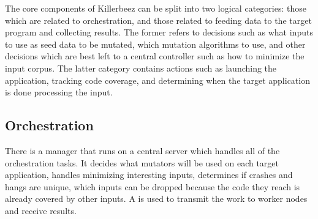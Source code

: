 The core components of Killerbeez can be split into two logical categories:
those which are related to orchestration, and those related to feeding data
to the target program and collecting results.  The former refers to decisions
such as what inputs to use as seed data to be mutated, which mutation
algorithms to use, and other decisions which are best left to a central
controller such as how to minimize the input corpus.  The latter category
contains actions such as launching the application, tracking code coverage,
and determining when the target application is done processing the input.

\subsection{Orchestration}
There is a manager that runs on a central server which handles all of the
orchestration tasks.  It decides what mutators will be used on each target
application, handles minimizing interesting inputs, determines if crashes
and hangs are unique, which inputs can be dropped because the code they
reach is already covered by other inputs. A \BOINC{} is used to transmit
the work to worker nodes and receive results.

